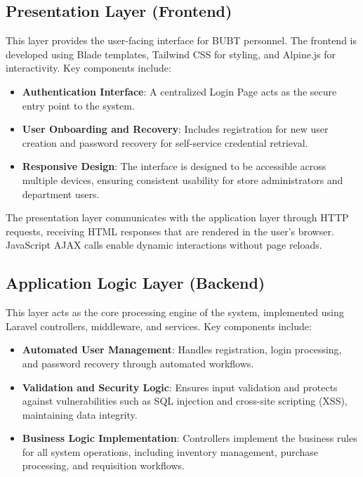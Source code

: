 \subsection{Presentation Layer (Frontend)}

This layer provides the user-facing interface for BUBT personnel. The frontend is developed using Blade templates, Tailwind CSS for styling, and Alpine.js for interactivity. Key components include:

\begin{itemize}
    \item \textbf{Authentication Interface}: A centralized Login Page acts as the secure entry point to the system.
    \item \textbf{User Onboarding and Recovery}: Includes registration for new user creation and password recovery for self-service credential retrieval.
    \item \textbf{Responsive Design}: The interface is designed to be accessible across multiple devices, ensuring consistent usability for store administrators and department users.
\end{itemize}

The presentation layer communicates with the application layer through HTTP requests, receiving HTML responses that are rendered in the user's browser. JavaScript AJAX calls enable dynamic interactions without page reloads.

\subsection{Application Logic Layer (Backend)}

This layer acts as the core processing engine of the system, implemented using Laravel controllers, middleware, and services. Key components include:

\begin{itemize}
    \item \textbf{Automated User Management}: Handles registration, login processing, and password recovery through automated workflows.
    \item \textbf{Validation and Security Logic}: Ensures input validation and protects against vulnerabilities such as SQL injection and cross-site scripting (XSS), maintaining data integrity.
    \item \textbf{Business Logic Implementation}: Controllers implement the business rules for all system operations, including inventory management, purchase processing, and requisition workflows.
\end{itemize}

